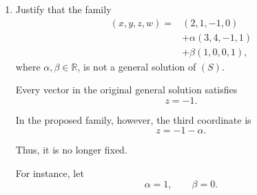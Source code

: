 \begin{enumerate}[label=\alph*)]
\begin{answer}
    Since $1+\lambda$ and $\mu-2$ independently range over $\mathbb{R}$, this is the same
    solution set.

    Hence \textbf{family ii) is valid}.

    \textbf{Family iii).}

    The proposed particular solution is
    $$
    u'=(3,1,-1,0).
    $$

    We impose
    $$
    X(s,t)=u'.
    $$

    Thus,
    $$
    \begin{cases}
    2+s+t=3,\\
    1+3s=1,\\
    -1=-1,\\
    s+t=0.
    \end{cases}
    $$

    The first equation requires
    $$
    s+t=1,
    $$

    whereas the fourth requires
    $$
    s+t=0.
    $$

    These conditions are contradictory.
    Therefore, no values of $s,t$ produce the proposed vector $u'$.

    Hence \textbf{family iii) is invalid}.

    \textbf{Conclusion:}
    $$
    \boxed{\text{Families i) and ii) only.}}
    $$

    {\color{red}
    \textbf{Important:} Subtracting $u$ simply isolates the parameter-dependent part.
    We are not proving that $u=u'$; we are checking whether $u'$ already belongs to the original
    family of solutions.
    }
\end{answer}

\item Justify that the family
$$
\begin{aligned}
(x,y,z,w)
={}&(2,1,-1,0)\\
&+\alpha(3,4,-1,1)\\
&+\beta(1,0,0,1),
\end{aligned}
$$
where $\alpha,\beta\in\mathbb{R}$,
is not a general solution of $(S)$.

\begin{answer}
    Every vector in the original general solution satisfies
    $$
    z=-1.
    $$

    In the proposed family, however, the third coordinate is
    $$
    z=-1-\alpha.
    $$

    Thus, it is no longer fixed.

    For instance, let
    $$
    \alpha=1,\qquad\beta=0.
    $$


\end{answer}
\end{enumerate}
